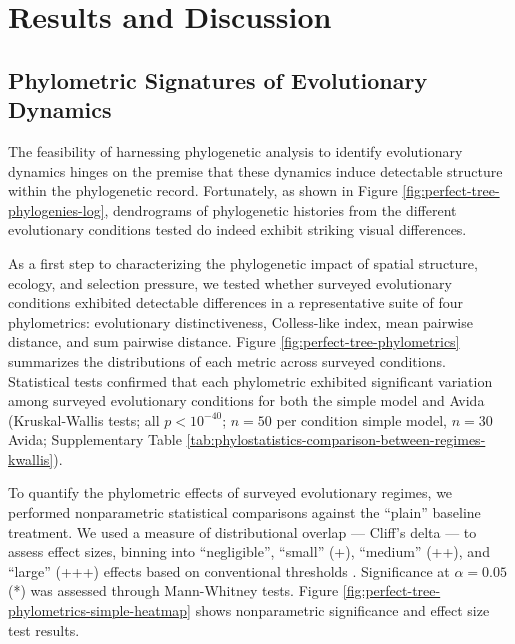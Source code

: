 \section{Results and Discussion}
\label{sec:results}

\subsection{Phylometric Signatures of Evolutionary Dynamics}




The feasibility of harnessing phylogenetic analysis to identify evolutionary dynamics hinges on the premise that these dynamics induce detectable structure within the phylogenetic record.
Fortunately, as shown in Figure \ref{fig:perfect-tree-phylogenies-log}, dendrograms of phylogenetic histories from the different evolutionary conditions tested do indeed exhibit striking visual differences.

As a first step to characterizing the phylogenetic impact of spatial structure, ecology, and selection pressure, we tested whether surveyed evolutionary conditions exhibited detectable differences in a representative suite of four phylometrics: evolutionary distinctiveness, Colless-like index, mean pairwise distance, and sum pairwise distance.
Figure \ref{fig:perfect-tree-phylometrics} summarizes the distributions of each metric across surveyed conditions.
Statistical tests confirmed that each phylometric exhibited significant variation among surveyed evolutionary conditions for both the simple model and Avida (Kruskal-Wallis tests; all $p < 10^{-40}$; $n=50$ per condition simple model, $n=30$ Avida; Supplementary Table \ref{tab:phylostatistics-comparison-between-regimes-kwallis}).

To quantify the phylometric effects of surveyed evolutionary regimes, we performed nonparametric statistical comparisons against the ``plain'' baseline treatment.
We used a measure of distributional overlap --- Cliff's delta --- to assess effect sizes, binning into ``negligible'', ``small'' (+), ``medium'' (++), and ``large'' (+++) effects based on conventional thresholds \citep{hess2004robust}.
Significance at $\alpha = 0.05$ (*) was assessed through Mann-Whitney tests.
Figure \ref{fig:perfect-tree-phylometrics-simple-heatmap} shows nonparametric significance and effect size test results.

